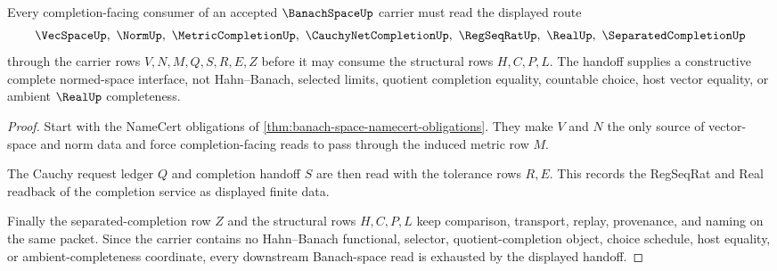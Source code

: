 \begin{theorem}
\label{thm:banach-space-cauchy-completion-handoff}
Every completion-facing consumer of an accepted $\BanachSpaceUp$ carrier must read the displayed route
$$
\VecSpaceUp,\ \NormUp,\ \MetricCompletionUp,\ \CauchyNetCompletionUp,\ \RegSeqRatUp,\ \RealUp,\ \SeparatedCompletionUp
$$
through the carrier rows $V,N,M,Q,S,R,E,Z$ before it may consume the structural rows $H,C,P,L$. The handoff supplies a constructive complete normed-space interface, not Hahn--Banach, selected limits, quotient completion equality, countable choice, host vector equality, or ambient $\RealUp$ completeness.
\end{theorem}
\begin{proof}
Start with the NameCert obligations of \autoref{thm:banach-space-namecert-obligations}. They make $V$ and $N$ the only source of vector-space and norm data and force completion-facing reads to pass through the induced metric row $M$.

The Cauchy request ledger $Q$ and completion handoff $S$ are then read with the tolerance rows $R,E$. This records the RegSeqRat and Real readback of the completion service as displayed finite data.

Finally the separated-completion row $Z$ and the structural rows $H,C,P,L$ keep comparison, transport, replay, provenance, and naming on the same packet. Since the carrier contains no Hahn--Banach functional, selector, quotient-completion object, choice schedule, host equality, or ambient-completeness coordinate, every downstream Banach-space read is exhausted by the displayed handoff.
\end{proof}

